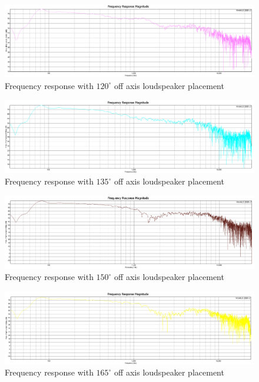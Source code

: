 \documentclass{article}
\begin{document}
\begin{figure}[htbp]
\begin{center}
\includegraphics[width=15cm,keepaspectratio=true]{Figures/TaskBFR120deg}
\caption{Frequency response with $120^\circ$ off axis loudspeaker placement}
\label{fig:TaskBFR120deg}
\end{center}
\end{figure}
\begin{figure}[htbp]
\begin{center}
\includegraphics[width=15cm,keepaspectratio=true]{Figures/TaskBFR135deg}
\caption{Frequency response with $135^\circ$ off axis loudspeaker placement}
\label{fig:TaskBFR135deg}
\end{center}
\end{figure}
\begin{figure}[htbp]
\begin{center}
\includegraphics[width=15cm,keepaspectratio=true]{Figures/TaskBFR150deg}
\caption{Frequency response with $150^\circ$ off axis loudspeaker placement}
\label{fig:TaskBFR150deg}
\end{center}
\end{figure}
\begin{figure}[htbp]
\begin{center}
\includegraphics[width=15cm,keepaspectratio=true]{Figures/TaskBFR165deg}
\caption{Frequency response with $165^\circ$ off axis loudspeaker placement}
\label{fig:TaskBFR165deg}
\end{center}
\end{figure}
\end{document}
